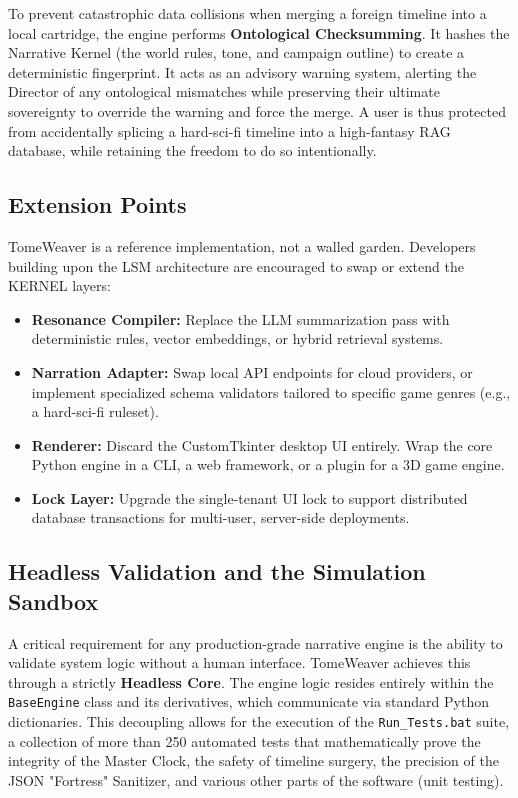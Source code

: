 \documentclass[12pt, a4paper]{article}
\begin{document}
To prevent catastrophic data collisions when merging a foreign timeline into a local cartridge, the engine performs \textbf{Ontological Checksumming}. It hashes the Narrative Kernel (the world rules, tone, and campaign outline) to create a deterministic fingerprint. It acts as an advisory warning system, alerting the Director of any ontological mismatches while preserving their ultimate sovereignty to override the warning and force the merge. A user is thus protected from accidentally splicing a hard-sci-fi timeline into a high-fantasy RAG database, while retaining the freedom to do so intentionally.

\subsection{Extension Points}

TomeWeaver is a reference implementation, not a walled garden. Developers building upon the LSM architecture are encouraged to swap or extend the KERNEL layers:

\begin{itemize}
    \item \textbf{Resonance Compiler:} Replace the LLM summarization pass with deterministic rules, vector embeddings, or hybrid retrieval systems.
    \item \textbf{Narration Adapter:} Swap local API endpoints for cloud providers, or implement specialized schema validators tailored to specific game genres (e.g., a hard-sci-fi ruleset).
    \item \textbf{Renderer:} Discard the CustomTkinter desktop UI entirely. Wrap the core Python engine in a CLI, a web framework, or a plugin for a 3D game engine.
    \item \textbf{Lock Layer:} Upgrade the single-tenant UI lock to support distributed database transactions for multi-user, server-side deployments.
\end{itemize}


\subsection{Headless Validation and the Simulation Sandbox}

A critical requirement for any production-grade narrative engine is the ability to validate system logic without a human interface. TomeWeaver achieves this through a strictly \textbf{Headless Core}. The engine logic resides entirely within the \texttt{BaseEngine} class and its derivatives, which communicate via standard Python dictionaries. This decoupling allows for the execution of the \texttt{Run\_Tests.bat} suite, a collection of more than 250 automated tests that mathematically prove the integrity of the Master Clock, the safety of timeline surgery, the precision of the JSON "Fortress" Sanitizer, and various other parts of the software (unit testing).
\end{document}

